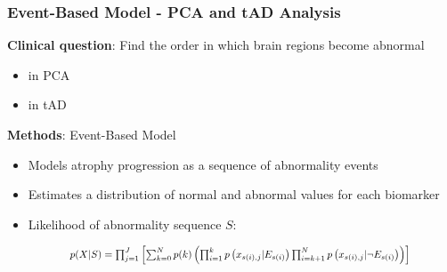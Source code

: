 \documentclass[10pt,xcolor=table]{beamer}
\begin{document}
\begin{frame}
\frametitle{Event-Based Model - PCA and tAD Analysis}

\textbf{Clinical question}: Find the order in which brain regions become abnormal
\begin{itemize}
 \item in PCA 
 \item in tAD
\end{itemize}


\textbf{Methods}: Event-Based Model
\begin{itemize}
 \item Models atrophy progression as a sequence of abnormality events
 \item Estimates a distribution of normal and abnormal values for each biomarker
 \item Likelihood of abnormality sequence $S$:
 
\begin{equation}
\resizebox{0.8\columnwidth}{!}{%
 $p(X|S) = \prod_{j=1}^J \left[ \sum_{k=0}^N p(k) \left( \prod_{i=1}^k p\left(x_{s(i),j} | E_{s(i)} \right) \prod_{i=k+1}^N p\left(x_{s(i),j} | \neg E_{s(i)}\right) \right) \right]$
 }
\end{equation}
\end{itemize}

\end{frame}


\newcommand*{\scaleBrainImg}{0.2}
\newcommand*{\scaleAllSubfigsImg}{0.4}

\newcommand*{\snapLocationPCA}{../images/ebm/mriAllGaussUnifDirPCA/snapshots} %
\end{document}
